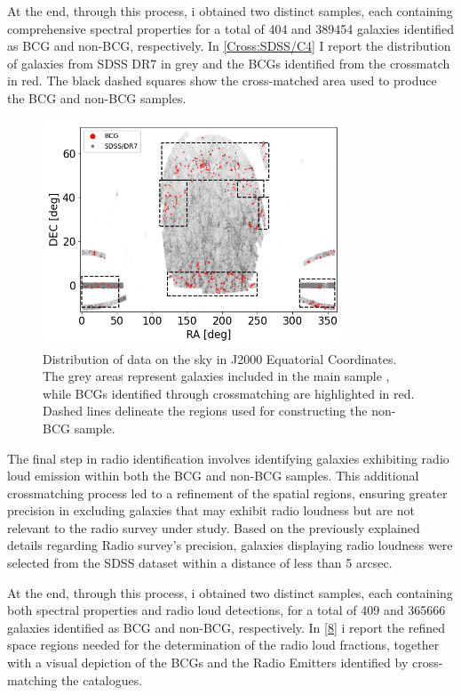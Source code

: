 At the end, through this process, i obtained two distinct samples, each containing comprehensive spectral properties for a total of 404 and 389454 galaxies identified as BCG and non-BCG, respectively. 
In \autoref{Cross:SDSS/C4} I report the distribution of galaxies from SDSS DR7 in grey and the BCGs identified from the crossmatch in red. The black dashed squares show the cross-matched area used to produce the BCG and non-BCG samples.

\begin{figure}[hbtp]
  \centering
  \includegraphics[width=0.8\textwidth]{BCGcmSDSS}
  \caption{Distribution of data on the sky in J2000 Equatorial Coordinates. The grey areas represent galaxies included in the main sample \cite{mpa-sdss-dr7}, while BCGs identified through crossmatching are highlighted in red. Dashed lines delineate the regions used for constructing the non-BCG sample. }
  \label{Cross:SDSS/C4}
\end{figure}

The final step in radio identification involves identifying galaxies exhibiting radio loud emission within both the BCG and non-BCG samples. This additional crossmatching process led to a refinement of the spatial regions, ensuring greater precision in excluding galaxies that may exhibit radio loudness but are not relevant to the radio survey under study. Based on the previously explained details regarding Radio survey's precision, galaxies displaying radio loudness were selected from the SDSS dataset within a distance of less than 5 arcsec. 

At the end, through this process, i obtained two distinct samples, each containing both spectral properties and radio loud detections, for a total of 409 and 365666 galaxies identified as BCG and non-BCG, respectively. In \autoref{8} i report the refined space regions needed for the determination of the radio loud fractions, together with a visual depiction of the BCGs and the Radio Emitters identified by cross-matching the catalogues. 

